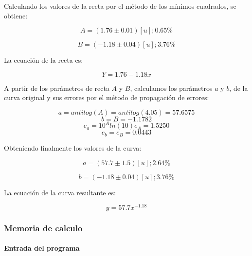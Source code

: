 \documentclass[letter,11pt]{article}
\begin{document}
Calculando los valores de la recta por el método de los mínimos cuadrados, se
obtiene:

\begin{equation}
    A = (1.76 \pm 0.01)[u];0.65\%
\end{equation}

\begin{equation}
    B = (-1.18 \pm 0.04)[u];3.76\%
\end{equation}

La ecuación de la recta es:

\begin{equation}
    Y = 1.76 - 1.18 x
\end{equation}

A partir de los parámetros de recta $A$ y $B$, calculamos los parámetros $a$ y
$b$, de la curva original y sus errores por el método de propagación de errores:

\begin{equation*}
    a = antilog(A) = antilog(4.05) = 57.6575
\end{equation*}
\begin{equation*}
    b = B = -1.1782
\end{equation*}
\begin{equation*}
    e_a = 10^A ln(10) e_A = 1.5250
\end{equation*}
\begin{equation*}
    e_b = e_B = 0.0443
\end{equation*}

Obteniendo finalmente los valores de la curva:

\begin{equation}
    a = (57.7 \pm 1.5)[u];2.64\%
\end{equation}

\begin{equation}
    b = (-1.18 \pm 0.04)[u];3.76\%
\end{equation}

La ecuación de la curva resultante es:

\begin{equation}
    y = 57.7 x^{-1.18}
\end{equation}

\subsubsection{Memoria de calculo}

\paragraph{Entrada del programa}
\begin{alltt}
\footnotesize

\normalsize
\end{alltt}
\end{document}
